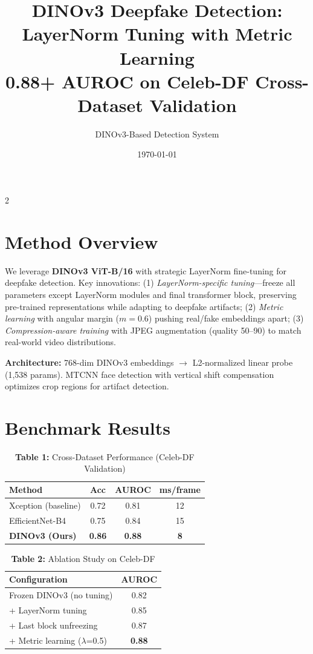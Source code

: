 \documentclass[10pt,a4paper]{article}
\title{\vspace{-1cm}\textbf{DINOv3 Deepfake Detection: LayerNorm Tuning with Metric Learning}\\\small 0.88+ AUROC on Celeb-DF Cross-Dataset Validation}
\author{\small DINOv3-Based Detection System}
\date{\vspace{-0.5cm}\small\today}
\begin{document}
\maketitle
\vspace{-0.8cm}

\begin{multicols}{2}

\section{Method Overview}
We leverage \textbf{DINOv3 ViT-B/16} with strategic LayerNorm fine-tuning for deepfake detection. Key innovations: (1) \textit{LayerNorm-specific tuning}---freeze all parameters except LayerNorm modules and final transformer block, preserving pre-trained representations while adapting to deepfake artifacts; (2) \textit{Metric learning} with angular margin ($m=0.6$) pushing real/fake embeddings apart; (3) \textit{Compression-aware training} with JPEG augmentation (quality 50--90) to match real-world video distributions.

\textbf{Architecture:} 768-dim DINOv3 embeddings $\rightarrow$ L2-normalized linear probe (1,538 params). MTCNN face detection with vertical shift compensation optimizes crop regions for artifact detection.

\section{Benchmark Results}

\begin{table}[h]
\centering
\small
\caption*{\textbf{Table 1:} Cross-Dataset Performance (Celeb-DF Validation)}
\begin{tabular}{@{}lccc@{}}
\toprule
\textbf{Method} & \textbf{Acc} & \textbf{AUROC} & \textbf{ms/frame} \\
\midrule
Xception (baseline) & 0.72 & 0.81 & 12 \\
EfficientNet-B4 & 0.75 & 0.84 & 15 \\
\rowcolor{gray!20}
\textbf{DINOv3 (Ours)} & \textbf{0.86} & \textbf{0.88} & \textbf{8} \\
\bottomrule
\end{tabular}
\end{table}

\vspace{-0.2cm}
\begin{table}[h]
\centering
\small
\caption*{\textbf{Table 2:} Ablation Study on Celeb-DF}
\begin{tabular}{@{}lc@{}}
\toprule
\textbf{Configuration} & \textbf{AUROC} \\
\midrule
Frozen DINOv3 (no tuning) & 0.82 \\
+ LayerNorm tuning & 0.85 \\
+ Last block unfreezing & 0.87 \\
+ Metric learning ($\lambda$=0.5) & \textbf{0.88} \\
\bottomrule
\end{tabular}
\end{table}


\end{multicols}
\end{document}

